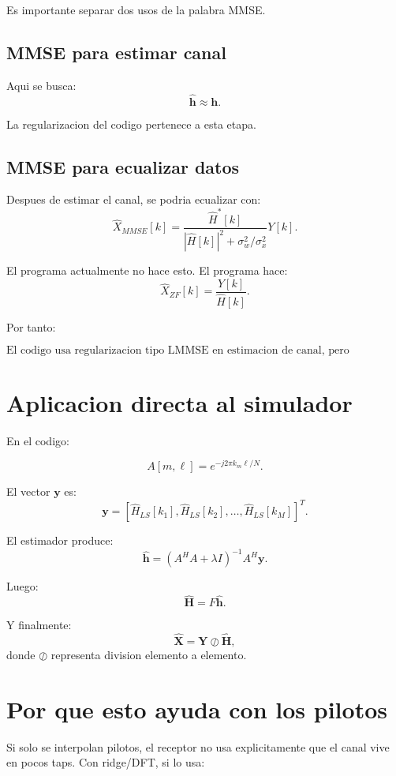 \documentclass[11pt]{article}
\begin{document}
Es importante separar dos usos de la palabra MMSE.

\subsection{MMSE para estimar canal}

Aqui se busca:
\[
    \hat{\bm h}
    \approx
    \bm h.
\]

La regularizacion del codigo pertenece a esta etapa.

\subsection{MMSE para ecualizar datos}

Despues de estimar el canal, se podria ecualizar con:
\[
    \hat{X}_{MMSE}[k]
    =
    \frac{\hat{H}^*[k]}
    {|\hat{H}[k]|^2+\sigma_w^2/\sigma_x^2}
    Y[k].
\]

El programa actualmente no hace esto. El programa hace:
\[
    \hat{X}_{ZF}[k]
    =
    \frac{Y[k]}{\hat{H}[k]}.
\]

Por tanto:

\[
\boxed{
\text{El codigo usa regularizacion tipo LMMSE en estimacion de canal,
pero ecualizacion final ZF.}
}
\]

\section{Aplicacion directa al simulador}

En el codigo:

\[
    A[m,\ell] = e^{-j2\pi k_m\ell/N}.
\]

El vector \(\bm y\) es:
\[
    \bm y =
    \left[
        \hat{H}_{LS}[k_1],
        \hat{H}_{LS}[k_2],
        \ldots,
        \hat{H}_{LS}[k_M]
    \right]^T.
\]

El estimador produce:
\[
    \hat{\bm h}
    =
    (A^HA+\lambda I)^{-1}A^H\bm y.
\]

Luego:
\[
    \hat{\bm H}
    =
    F\hat{\bm h}.
\]

Y finalmente:
\[
    \hat{\bm X}
    =
    \bm Y \oslash \hat{\bm H},
\]
donde \(\oslash\) representa division elemento a elemento.

\section{Por que esto ayuda con los pilotos}

Si solo se interpolan pilotos, el receptor no usa explicitamente que el canal
vive en pocos taps. Con ridge/DFT, si lo usa:
\end{document}
